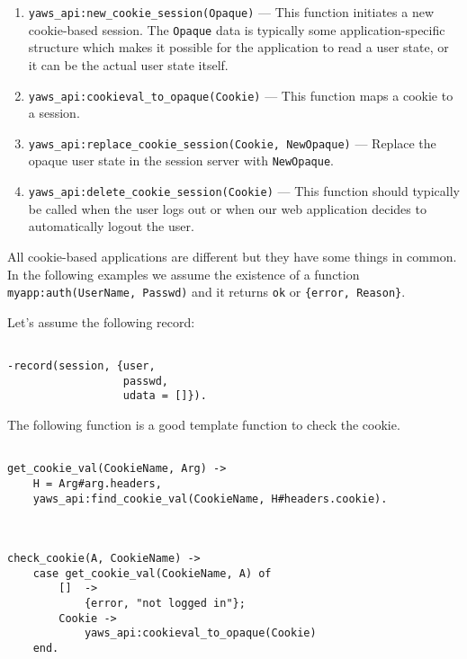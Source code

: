 \documentclass[11pt,oneside,english]{book}
\begin{document}
\begin{enumerate}
\item \verb+yaws_api:new_cookie_session(Opaque)+ --- This function
  initiates a new cookie-based session. The \verb+Opaque+ data is
  typically some application-specific structure which makes it
  possible for the application to read a user state, or it can be the
  actual user state itself.

\item \verb+yaws_api:cookieval_to_opaque(Cookie)+ --- This function
  maps a cookie to a session.

\item \verb+yaws_api:replace_cookie_session(Cookie, NewOpaque)+ ---
  Replace the opaque user state in the session server with
  \verb+NewOpaque+.

\item \verb+yaws_api:delete_cookie_session(Cookie)+ --- This function
  should typically be called when the user logs out or when our web
  application decides to automatically logout the user.

\end{enumerate}

All cookie-based applications are different but they have some things
in common. In the following examples we assume the existence of a
function \verb+myapp:auth(UserName, Passwd)+ and it returns \verb+ok+
or \verb+{error, Reason}+.

Let's assume the following record:

\begin{verbatim}

-record(session, {user,
                  passwd,
                  udata = []}).

\end{verbatim}

The following function is a good template function to check the
cookie.

\begin{verbatim}

get_cookie_val(CookieName, Arg) ->
    H = Arg#arg.headers,
    yaws_api:find_cookie_val(CookieName, H#headers.cookie).



check_cookie(A, CookieName) ->
    case get_cookie_val(CookieName, A) of
        []  ->
            {error, "not logged in"};
        Cookie ->
            yaws_api:cookieval_to_opaque(Cookie)
    end.

\end{verbatim}
\end{document}
